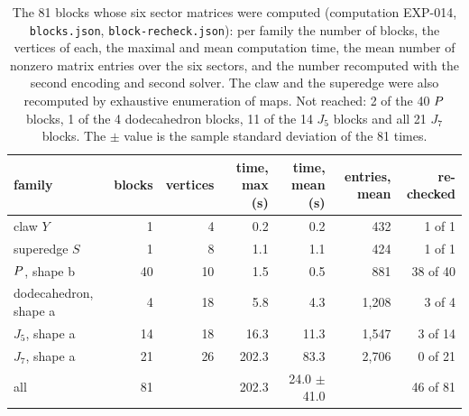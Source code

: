 \begin{table}[t]\centering\footnotesize
\setlength{\tabcolsep}{3pt}
\begin{tabular}{lrrrrrr}
\toprule
family & blocks & vertices & time, max (s) & time, mean (s) & entries, mean & re-checked \\
\midrule
claw $Y$ & 1 & 4 & 0.2 & 0.2 & 432 & 1 of 1 \\
superedge $S$ & 1 & 8 & 1.1 & 1.1 & 424 & 1 of 1 \\
$P$, shape b & 40 & 10 & 1.5 & 0.5 & 881 & 38 of 40 \\
dodecahedron, shape a & 4 & 18 & 5.8 & 4.3 & 1{,}208 & 3 of 4 \\
$J_5$, shape a & 14 & 18 & 16.3 & 11.3 & 1{,}547 & 3 of 14 \\
$J_7$, shape a & 21 & 26 & 202.3 & 83.3 & 2{,}706 & 0 of 21 \\
\midrule
all & 81 & & 202.3 & 24.0 $\pm$ 41.0 & & 46 of 81 \\
\bottomrule
\end{tabular}
\caption{The 81 blocks whose six sector matrices were computed (computation EXP-014, \texttt{blocks.json}, \texttt{block-recheck.json}): per family the number of blocks, the vertices of each, the maximal and mean computation time, the mean number of nonzero matrix entries over the six sectors, and the number recomputed with the second encoding and second solver. The claw and the superedge were also recomputed by exhaustive enumeration of maps. Not reached: 2 of the 40 $P$ blocks, 1 of the 4 dodecahedron blocks, 11 of the 14 $J_5$ blocks and all 21 $J_7$ blocks. The $\pm$ value is the sample standard deviation of the 81 times.}\label{tab:blocks}
\end{table}
